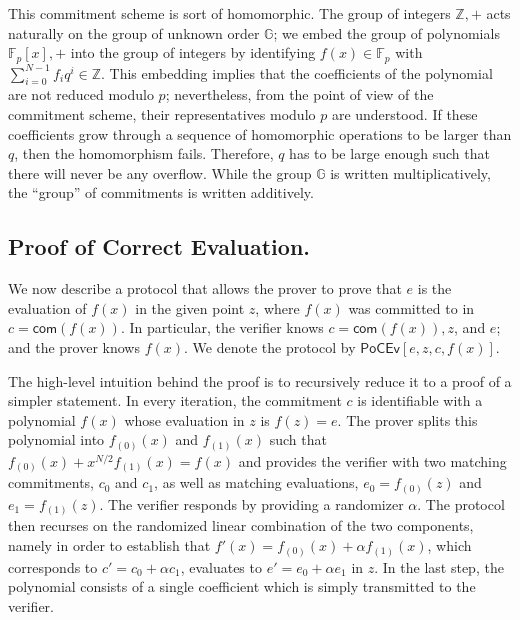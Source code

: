 \documentclass[10pt]{llncs}
\begin{document}
This commitment scheme is sort of homomorphic. The group of integers $\mathbb{Z}, +$ acts naturally on the group of unknown order $\mathbb{G}$; we embed the group of polynomials $\mathbb{F}_p[x], +$ into the group of integers by identifying $f(x) \in \mathbb{F}_p$ with $\sum_{i=0}^{N-1} f_iq^i \in \mathbb{Z}$. This embedding implies that the coefficients of the polynomial are not reduced modulo $p$; nevertheless, from the point of view of the commitment scheme, their representatives modulo $p$ are understood. If these coefficients grow through a sequence of homomorphic operations to be larger than $q$, then the homomorphism fails. Therefore, $q$ has to be large enough such that there will never be any overflow. While the group $\mathbb{G}$ is written multiplicatively, the ``group'' of commitments is written additively.

\subsection{Proof of Correct Evaluation.}

We now describe a protocol that allows the prover to prove that $e$ is the evaluation of $f(x)$ in the given point $z$, where $f(x)$ was committed to in $c = \mathsf{com}(f(x))$. In particular, the verifier knows $c = \mathsf{com}(f(x)), z$, and $e$; and the prover knows $f(x)$. We denote the protocol by $\mathsf{PoCEv}[e, z, c, f(x)]$.

The high-level intuition behind the proof is to recursively reduce it to a proof of a simpler statement. In every iteration, the commitment $c$ is identifiable with a polynomial $f(x)$ whose evaluation in $z$ is $f(z)=e$. The prover splits this polynomial into $f_{(0)}(x)$ and $f_{(1)}(x)$ such that $f_{(0)}(x) + x^{N/2}f_{(1)}(x) = f(x)$ and provides the verifier with two matching commitments, $c_0$ and $c_1$, as well as matching evaluations, $e_0 = f_{(0)}(z)$ and $e_1 = f_{(1)}(z)$. The verifier responds by providing a randomizer $\alpha$. The protocol then recurses on the randomized linear combination of the two components, namely in order to establish that $f'(x) = f_{(0)}(x) + \alpha{}f_{(1)}(x)$, which corresponds to $c' = c_0 + \alpha{}c_1$, evaluates to $e' = e_0 + \alpha{}e_1$ in $z$. In the last step, the polynomial consists of a single coefficient which is simply transmitted to the verifier.
\end{document}

